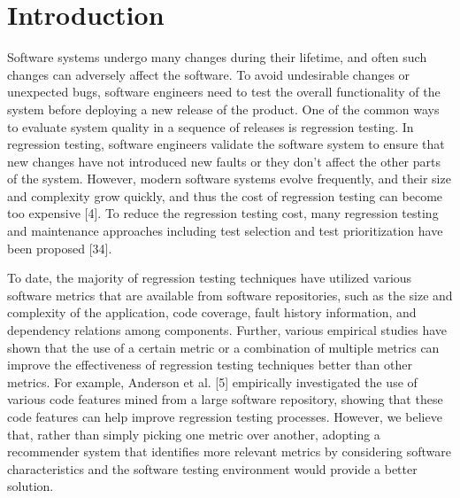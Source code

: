 \section{Introduction}
\label{sec:introduction}

Software systems undergo many changes during their lifetime, 
and often such changes can adversely affect the software. 
To avoid undesirable changes or unexpected bugs, 
software engineers need to test the overall 
functionality of the system before deploying 
a new release of the product. One of the common ways 
to evaluate system quality in a sequence of releases is 
regression testing. In regression testing, software engineers 
validate the software system to ensure that new changes 
have not introduced new faults or they don’t affect 
the other parts of the system. However, modern software systems 
evolve frequently, and their size and complexity grow quickly, 
and thus the cost of regression testing can become too expensive [4]. 
To reduce the regression testing cost, many regression testing and 
maintenance approaches including test selection and test prioritization  
have been proposed [34].

To date, the majority of regression testing techniques have 
utilized various software metrics that are available from software repositories, 
such as the size and complexity of the application, code coverage, 
fault history information, and dependency relations among components. 
Further, various empirical studies have shown that the use of a 
certain metric or a combination of multiple metrics can improve 
the effectiveness of regression testing techniques better than other metrics. 
For example, Anderson et al. [5] empirically investigated the 
use of various code features mined from a large software repository, 
showing that these code features can help improve regression testing processes. 
However, we believe that, rather than simply picking one metric over another, 
adopting a recommender system that identifies more relevant metrics by 
considering software characteristics and the software testing environment would provide a better solution.

